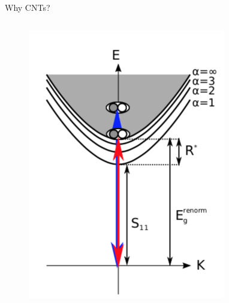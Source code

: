 \documentclass[xcolor = {dvipsnames}]{beamer}
\begin{document}
\begin{frame}{Why CNTs?}
\begin{columns}
\begin{column}{0.4\textwidth}
\begin{figure}
\begin{overprint}
    \centering\includegraphics[width=.8\textwidth]{images/exciton}
    \end{overprint}
\end{figure}

\end{column}

\end{columns}
\end{frame}
\end{document}
